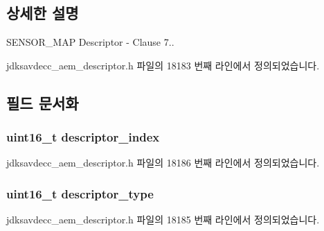 \subsection{상세한 설명}
S\+E\+N\+S\+O\+R\+\_\+\+M\+AP Descriptor -\/ Clause 7.. 

jdksavdecc\+\_\+aem\+\_\+descriptor.\+h 파일의 18183 번째 라인에서 정의되었습니다.



\subsection{필드 문서화}
\subsubsection[{\texorpdfstring{descriptor\+\_\+index}{descriptor_index}}]{\setlength{\rightskip}{0pt plus 5cm}uint16\+\_\+t descriptor\+\_\+index}\hypertarget{structjdksavdecc__descriptor__sensor__unit__map_a042bbc76d835b82d27c1932431ee38d4}{}\label{structjdksavdecc__descriptor__sensor__unit__map_a042bbc76d835b82d27c1932431ee38d4}


jdksavdecc\+\_\+aem\+\_\+descriptor.\+h 파일의 18186 번째 라인에서 정의되었습니다.

\subsubsection[{\texorpdfstring{descriptor\+\_\+type}{descriptor_type}}]{\setlength{\rightskip}{0pt plus 5cm}uint16\+\_\+t descriptor\+\_\+type}\hypertarget{structjdksavdecc__descriptor__sensor__unit__map_ab7c32b6c7131c13d4ea3b7ee2f09b78d}{}\label{structjdksavdecc__descriptor__sensor__unit__map_ab7c32b6c7131c13d4ea3b7ee2f09b78d}


jdksavdecc\+\_\+aem\+\_\+descriptor.\+h 파일의 18185 번째 라인에서 정의되었습니다.

